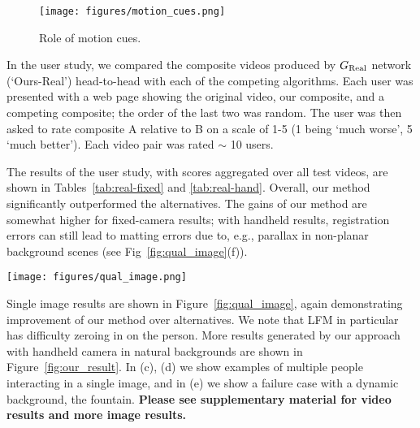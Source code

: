 \documentclass[10pt,twocolumn,letterpaper]{article}
\begin{document}
\begin{figure}[ht!]
	\centering
	\texttt{[image: figures/motion\_cues.png]}    \vspace{-0.5em}
	\caption{\small Role of motion cues.}
	\vspace{-1em}
	\label{fig:motion_cues}
\end{figure}





In the user study, we compared the composite videos produced by $G_{\rm Real}$ network (`Ours-Real') head-to-head with each of the competing algorithms.  Each user was presented with a web page showing the original video, our composite, and a competing composite; the order of the last two was random.  The user was then asked to rate composite A relative to B on a scale of 1-5 (1 being `much worse', 5 `much better').  Each video pair was rated $\sim$ 10 users.



The results of the user study, with scores aggregated over all test videos, are shown in Tables~\ref{tab:real-fixed} and \ref{tab:real-hand}. Overall, our method significantly outperformed the alternatives.  The gains of our method are somewhat higher for fixed-camera results; with handheld results, registration errors can still lead to matting errors due to, e.g., parallax in non-planar background scenes (see Fig~\ref{fig:qual_image}(f)).


\begin{figure*}[!ht]
	\centering
	\texttt{[image: figures/qual\_image.png]}    \vspace{-.2cm}
	\caption{\small Comparison of matting methods with camera fixed (a,b,c) and handheld (d,e,f). Our method fails in (f) due to misregistration.} 
	\vspace{-1em}
	\label{fig:qual_image}
\end{figure*}

Single image results are shown in Figure~\ref{fig:qual_image}, again demonstrating improvement of our method over alternatives.  We note that LFM in particular has difficulty zeroing in on the person.  More results generated by our approach with handheld camera in natural backgrounds are shown in Figure~\ref{fig:our_result}. In (c), (d) we show examples of multiple people interacting in a single image, and in (e) we show a failure case with a dynamic background, the fountain. \textbf{Please see supplementary material for video results and more image results.}
\end{document}
